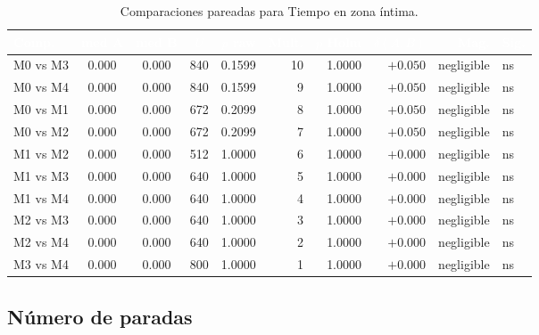 \documentclass[12pt,a4paper,oneside]{book}
\begin{document}
\begin{table}[H]
\centering
\small
\caption{Comparaciones pareadas para Tiempo en zona íntima.}
\renewcommand{\arraystretch}{1.15}
\begin{tabular}{lcccrrrrrl}
\toprule
\rowcolor{primary}
\textcolor{white}{\textbf{Comp.}} & \textcolor{white}{\textbf{med A}} & \textcolor{white}{\textbf{med B}} & \textcolor{white}{\textbf{$U$}} & \textcolor{white}{\textbf{$p$ raw}} & \textcolor{white}{\textbf{Mult.}} & \textcolor{white}{\textbf{$p$ Holm}} & \textcolor{white}{\textbf{$\delta(A,B)$}} & \textcolor{white}{\textbf{Mag.}} & \textcolor{white}{\textbf{Sig.}} \\
\midrule
M0 vs M3 & 0.000 & 0.000 & 840 & 0.1599 & 10 & 1.0000 & $+0.050$ & negligible & ns \\
M0 vs M4 & 0.000 & 0.000 & 840 & 0.1599 & 9 & 1.0000 & $+0.050$ & negligible & ns \\
M0 vs M1 & 0.000 & 0.000 & 672 & 0.2099 & 8 & 1.0000 & $+0.050$ & negligible & ns \\
M0 vs M2 & 0.000 & 0.000 & 672 & 0.2099 & 7 & 1.0000 & $+0.050$ & negligible & ns \\
M1 vs M2 & 0.000 & 0.000 & 512 & 1.0000 & 6 & 1.0000 & $+0.000$ & negligible & ns \\
M1 vs M3 & 0.000 & 0.000 & 640 & 1.0000 & 5 & 1.0000 & $+0.000$ & negligible & ns \\
M1 vs M4 & 0.000 & 0.000 & 640 & 1.0000 & 4 & 1.0000 & $+0.000$ & negligible & ns \\
M2 vs M3 & 0.000 & 0.000 & 640 & 1.0000 & 3 & 1.0000 & $+0.000$ & negligible & ns \\
M2 vs M4 & 0.000 & 0.000 & 640 & 1.0000 & 2 & 1.0000 & $+0.000$ & negligible & ns \\
M3 vs M4 & 0.000 & 0.000 & 800 & 1.0000 & 1 & 1.0000 & $+0.000$ & negligible & ns \\
\bottomrule
\end{tabular}
\end{table}

\subsection{Número de paradas}
\end{document}
